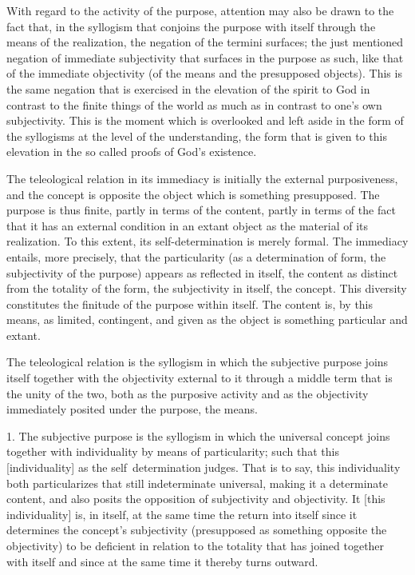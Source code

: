 With regard to the activity of the purpose,
attention may also be drawn to the fact that,
in the syllogism that conjoins the purpose with itself
through the means of the realization,
the negation of the termini surfaces;
the just mentioned negation of immediate subjectivity
that surfaces in the purpose as such,
like that of the immediate objectivity
(of the means and the presupposed objects).
This is the same negation that is exercised
in the elevation of the spirit to God
in contrast to the finite things of the world
as much as in contrast to one's own subjectivity.
This is the moment which is overlooked
and left aside in the form of the syllogisms
at the level of the understanding,
the form that is given to this elevation
in the so called proofs of God's existence.

The teleological relation in its immediacy is
initially the external purposiveness,
and the concept is opposite the object
which is something presupposed.
The purpose is thus finite,
partly in terms of the content,
partly in terms of the fact that
it has an external condition in an extant object
as the material of its realization.
To this extent, its self-determination is merely formal.
The immediacy entails, more precisely, that the particularity
(as a determination of form, the subjectivity of the purpose)
appears as reflected in itself,
the content as distinct from the totality of the form,
the subjectivity in itself, the concept.
This diversity constitutes the finitude of
the purpose within itself.
The content is, by this means,
as limited, contingent, and given
as the object is something particular and extant.

The teleological relation is the syllogism
in which the subjective purpose joins itself
together with the objectivity external to it
through a middle term that is the unity of the two,
both as the purposive activity and as the objectivity
immediately posited under the purpose, the means.

1. The subjective purpose is the syllogism
in which the universal concept joins
together with individuality
by means of particularity;
such that this [individuality]
as the self~determination judges.
That is to say, this individuality
both particularizes that still indeterminate universal,
making it a determinate content,
and also posits the opposition of
subjectivity and objectivity.
It [this individuality] is, in itself,
at the same time the return into itself
since it determines the concept's subjectivity
(presupposed as something opposite the objectivity)
to be deficient in relation to the totality
that has joined together with itself
and since at the same time it thereby turns outward.

